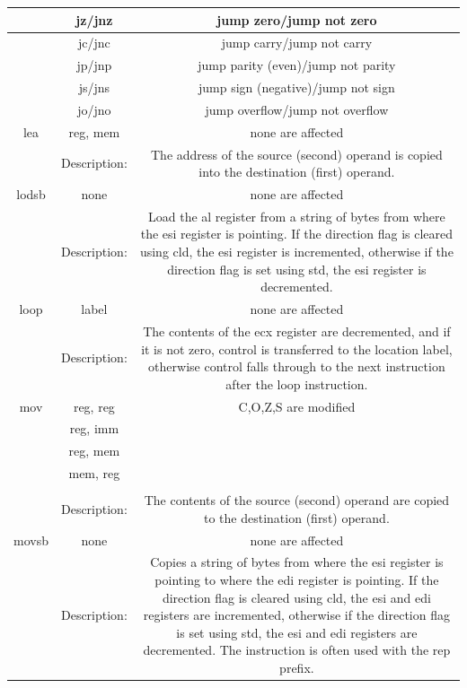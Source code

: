 \documentclass[10pt]{book}
\begin{document}
\begin{center}
\begin{center}
\begin{center}
\begin{center}
\begin{center}
\begin{center}
\begin{tabular}{|c|c|c|}
\hline
 & jz/jnz & jump zero/jump not zero \\
\hline
 & jc/jnc & jump carry/jump not carry \\
\hline
 & jp/jnp & jump parity (even)/jump not parity \\
\hline
 & js/jns & jump sign (negative)/jump not sign \\
\hline
 & jo/jno & jump overflow/jump not overflow \\
\hline
lea & reg, mem & none are affected \\
\hline
 & Description: & The address of the source (second) operand is copied into the destination (first) operand. \\
\hline
lodsb & none & none are affected \\
\hline
 & Description: & Load the al register from a string of bytes from where the esi register is pointing. If the direction flag is cleared using cld, the esi register is incremented, otherwise if the direction flag is set using std, the esi register is decremented. \\
\hline
loop & label & none are affected \\
\hline
 & Description: & The contents of the ecx register are decremented, and if it is not zero, control is transferred to the location label, otherwise control falls through to the next instruction after the loop instruction. \\
\hline
mov & reg, reg & C,O,Z,S are modified \\
\hline
 & reg, imm &  \\
\hline
 & reg, mem &  \\
\hline
 & mem, reg &  \\
\hline
 &  &  \\
\hline
 & Description: & The contents of the source (second) operand are copied to the destination (first) operand. \\
\hline
movsb & none & none are affected \\
\hline
 & Description: & Copies a string of bytes from where the esi register is pointing to where the edi register is pointing. If the direction flag is cleared using cld, the esi and edi registers are incremented, otherwise if the direction flag is set using std, the esi and edi registers are decremented. The instruction is often used with the rep prefix. \\
\hline
\end{tabular}
\end{center}


\end{center}
\end{center}
\end{center}
\end{center}
\end{center}
\end{document}
